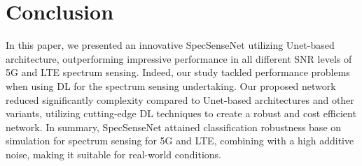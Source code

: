 \documentclass[journal]{IEEEtran} %
\begin{document}
\section{Conclusion}
In this paper, we presented an innovative SpecSenseNet utilizing Unet-based architecture, outperforming impressive performance in all different SNR levels of 5G and LTE spectrum sensing. Indeed, our study tackled performance problems when using DL for the spectrum sensing undertaking. Our proposed network reduced significantly complexity compared to Unet-based architectures and other variants, utilizing cutting-edge DL techniques to create a robust and cost efficient network. In summary, SpecSenseNet attained classification robustness base on simulation for spectrum sensing for 5G and LTE, combining with a high additive noise, making it suitable for real-world conditions. 



\end{document}
